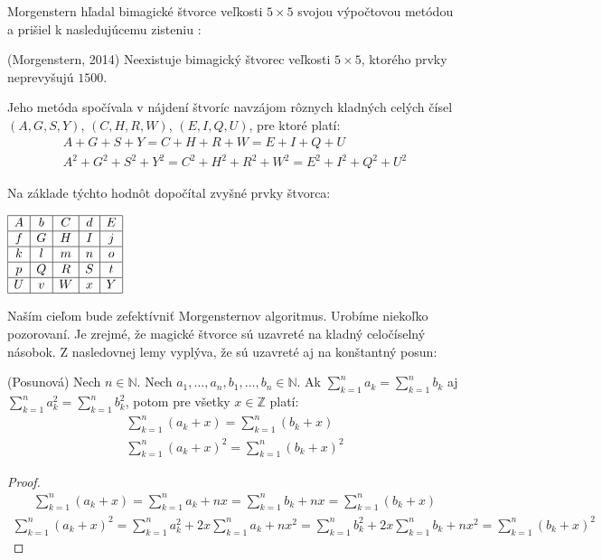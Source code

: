 Morgenstern hľadal bimagické štvorce veľkosti $5 \times 5$ svojou výpočtovou metódou a prišiel k nasledujúcemu zisteniu \cite{multimagie}:

\begin{theorem} (Morgenstern, 2014) Neexistuje bimagický štvorec veľkosti $5 \times 5$, ktorého prvky neprevyšujú $1500$.
\end{theorem}

Jeho metóda spočívala v nájdení štvoríc navzájom rôznych kladných celých čísel $(A,G,S,Y)$, $(C,H,R,W)$, $(E,I,Q,U)$, pre ktoré platí:
\begin{gather*}
A+G+S+Y = C+H+R+W = E+I+Q+U \\
A^2+G^2+S^2+Y^2 = C^2+H^2+R^2+W^2 = E^2+I^2+Q^2+U^2
\end{gather*}

Na základe týchto hodnôt dopočítal zvyšné prvky štvorca:

\begin{center}
$\begin{array}{ |c|c|c|c|c| }
\hline
A & b & C & d & E \\ 
\hline
f & G & H & I & j  \\ 
\hline
k & l & m & n & o \\ 
\hline
p & Q & R & S & t \\ 
\hline
U & v & W & x & Y \\
\hline
\end{array}$
\end{center}

Naším cieľom bude zefektívniť Morgensternov algoritmus. Urobíme niekoľko pozorovaní. Je zrejmé, že magické štvorce sú uzavreté na kladný celočíselný násobok. Z nasledovnej lemy vyplýva, že sú uzavreté aj na konštantný posun:

\begin{lemma}
\label{pos}
(Posunová) Nech $n \in \mathbb{N}$. Nech $a_1, \dots , a_n, b_1, \dots , b_n \in \mathbb{N}$. Ak $\sum_{k=1}^{n} a_k = \sum_{k=1}^{n} b_k$ aj $\sum_{k=1}^{n} a^2_k = \sum_{k=1}^{n} b^2_k$, potom pre všetky $x \in \mathbb{Z}$ platí:
\begin{gather*}
\sum_{k=1}^{n} (a_k + x) = \sum_{k=1}^{n} (b_k + x) \\
\sum_{k=1}^{n} (a_k + x)^2 = \sum_{k=1}^{n} (b_k + x)^2
\end{gather*}
\end{lemma}
 
\begin{proof}
\begin{gather*}
\sum_{k=1}^{n} (a_k + x) = \sum_{k=1}^{n} a_k + nx = \sum_{k=1}^{n} b_k + nx = \sum_{k=1}^{n} (b_k + x)
\end{gather*}
\begin{gather*}
\sum_{k=1}^{n} (a_k + x)^2 = \sum_{k=1}^{n} a^2_k + 2x \sum_{k=1}^{n} a_k + nx^2 = \sum_{k=1}^{n} b^2_k + 2x \sum_{k=1}^{n} b_k + nx^2 = \sum_{k=1}^{n} (b_k + x)^2
\end{gather*}
\end{proof}

